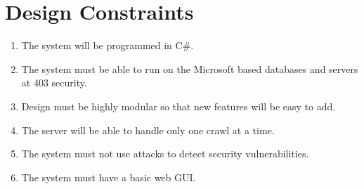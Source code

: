 \section{Design Constraints}
\begin{enumerate}
\item The system will be programmed in C\#.
\item The system must be able to run on the Microsoft based databases and servers at 403 security.
\item Design must be highly modular so that new features will be easy to add.
\item The server will be able to handle only one crawl at a time.
\item The system must not use attacks to detect security vulnerabilities.
\item The system must have a basic web GUI.
\end{enumerate}
